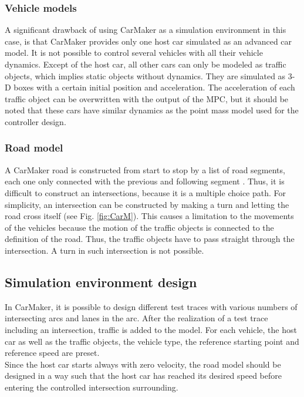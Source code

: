 \documentclass[letterpaper,10pt,conference]{ieeeconf}
\begin{document}
\subsubsection{Vehicle models}
A significant drawback of using CarMaker as a simulation environment in this case, is that CarMaker provides only one host car simulated as an advanced car model. It is not possible to control several vehicles with all their vehicle dynamics. Except of the host car, all other cars can only be modeled as traffic objects, which implies static objects without dynamics. They are simulated as 3-D boxes with a certain initial position and acceleration. The acceleration of each traffic object can be overwritten with the output of the MPC, but it should be noted that these cars have similar dynamics as the point mass model used for the controller design.
\subsubsection{Road model}
A CarMaker road is constructed from start to stop by a list of road segments, each one only connected with the previous and following segment \cite{guide}. Thus, it is difficult to construct an intersections, because it is a multiple choice path. For simplicity, an intersection can be constructed by making a turn and letting the road cross itself (see Fig. \ref{fig:CarM}). This causes a limitation to the movements of the vehicles because the motion of the traffic objects is connected to the definition of the road. Thus, the traffic objects have to pass straight through the intersection. A turn in such intersection is not possible.
\subsection{Simulation environment design}
In CarMaker, it is possible to design different test traces with various numbers of intersecting arcs and lanes in the arc. After the realization of a test trace including an intersection, traffic is added to the model. For each vehicle, the host car as well as the traffic objects, the vehicle type, the reference starting point and reference speed are preset.\\
Since the host car starts always with zero velocity, the road model should be designed in a way such that the host car has reached its desired speed before entering the controlled intersection surrounding. 
\end{document}
